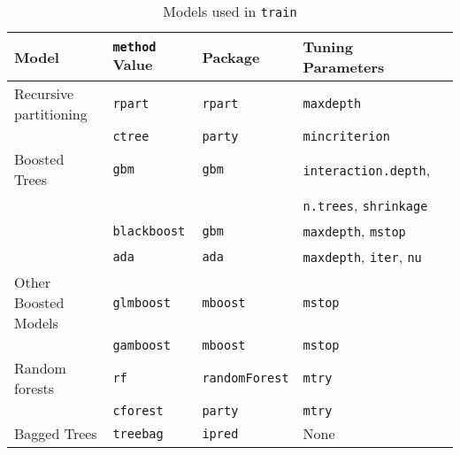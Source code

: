 \documentclass[12pt]{article}
\begin{document}
\begin{table}[hp]
   \begin{center}
      \caption{Models used in \texttt{train}}

      \vspace*{.2 in}   	        
      
      \label{T:methods}
      \begin{tabular}{lllll}
      Model & \texttt{method} Value & Package & Tuning Parameters  \\
      \hline
      
      Recursive partitioning &
         \texttt{rpart} & 
            \texttt{rpart}       & 
            \texttt{maxdepth} \\  
       &
         \texttt{ctree} & 
            \texttt{party}       & 
            \texttt{mincriterion} \\   
                  
      Boosted Trees &
         \texttt{gbm} & 
            \texttt{gbm}       & 
            \texttt{interaction.depth}, \\
      & & & \texttt{n.trees}, \texttt{shrinkage}  \\

       &
         \texttt{blackboost} & 
            \texttt{gbm}       & 
            \texttt{maxdepth}, \texttt{mstop}\\
            
       &
         \texttt{ada} & 
            \texttt{ada}       & 
            \texttt{maxdepth}, \texttt{iter}, \texttt{nu}\\            
     
      Other Boosted Models &
         \texttt{glmboost} & 
            \texttt{mboost}       &          
            \texttt{mstop}\\   
      &      
         \texttt{gamboost} & 
            \texttt{mboost}       &          
            \texttt{mstop}\\               
                 
      Random forests & 
         \texttt{rf} & 
            \texttt{randomForest}       & 
            \texttt{mtry} \\
                        
       & 
         \texttt{cforest} & 
            \texttt{party}       & 
            \texttt{mtry} \\     
                        
      Bagged Trees &
         \texttt{treebag} & 
            \texttt{ipred}       & 
            None \\                         
                        

\end{tabular}
\end{center}
\end{table}
\end{document}
